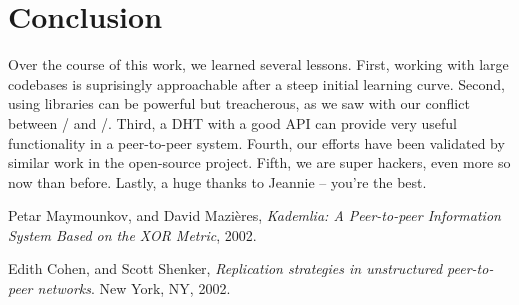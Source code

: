 \documentclass[11pt,twocolumn]{article}
\begin{document}
\section{Conclusion}
Over the course of this work, we learned several lessons.
First, working with large codebases is suprisingly approachable after a steep initial learning curve.
Second, using libraries can be powerful but treacherous, as we saw with our conflict between \Entangled/ and \Tornado/.
Third, a DHT with a good API can provide very useful functionality in a peer-to-peer system.
Fourth, our efforts have been validated by similar work in the open-source project.
Fifth, we are super hackers, even more so now than before.
Lastly, a huge thanks to Jeannie -- you're the best.

\begin{thebibliography}{9}

  Petar Maymounkov, and David Mazi\`{e}res,
  \emph{Kademlia: A Peer-to-peer Information System Based on the XOR Metric},
  2002.

  Edith Cohen, and Scott Shenker,
  \emph{Replication strategies in unstructured peer-to-peer networks}.
  New York, NY,
  2002.
\end{thebibliography}
\end{document}
